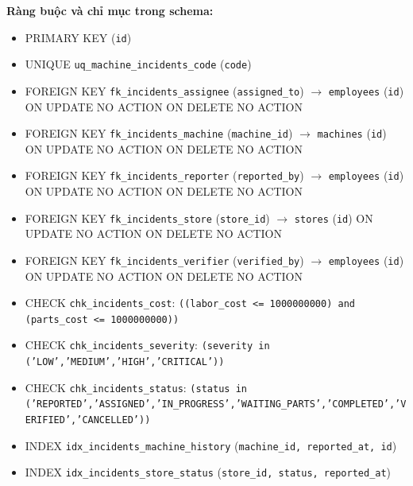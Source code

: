 \textbf{Ràng buộc và chỉ mục trong schema:}

\begin{itemize}

\item PRIMARY KEY (\texttt{id})

\item UNIQUE \texttt{uq\_machine\_incidents\_code} (\texttt{code})

\item FOREIGN KEY \texttt{fk\_incidents\_assignee} (\texttt{assigned\_to}) $\rightarrow$ \texttt{employees} (\texttt{id}) ON UPDATE NO ACTION ON DELETE NO ACTION

\item FOREIGN KEY \texttt{fk\_incidents\_machine} (\texttt{machine\_id}) $\rightarrow$ \texttt{machines} (\texttt{id}) ON UPDATE NO ACTION ON DELETE NO ACTION

\item FOREIGN KEY \texttt{fk\_incidents\_reporter} (\texttt{reported\_by}) $\rightarrow$ \texttt{employees} (\texttt{id}) ON UPDATE NO ACTION ON DELETE NO ACTION

\item FOREIGN KEY \texttt{fk\_incidents\_store} (\texttt{store\_id}) $\rightarrow$ \texttt{stores} (\texttt{id}) ON UPDATE NO ACTION ON DELETE NO ACTION

\item FOREIGN KEY \texttt{fk\_incidents\_verifier} (\texttt{verified\_by}) $\rightarrow$ \texttt{employees} (\texttt{id}) ON UPDATE NO ACTION ON DELETE NO ACTION

\item CHECK \texttt{chk\_incidents\_cost}: \texttt{((labor\_cost <= 1000000000) and (parts\_cost <= 1000000000))}

\item CHECK \texttt{chk\_incidents\_severity}: \texttt{(severity in ('LOW','MEDIUM','HIGH','CRITICAL'))}

\item CHECK \texttt{chk\_incidents\_status}: \texttt{(status in ('REPORTED','ASSIGNED','IN\_PROGRESS','WAITING\_PARTS','COMPLETED','VERIFIED','CANCELLED'))}

\item INDEX \texttt{idx\_incidents\_machine\_history} (\texttt{machine\_id, reported\_at, id})

\item INDEX \texttt{idx\_incidents\_store\_status} (\texttt{store\_id, status, reported\_at})

\end{itemize}

